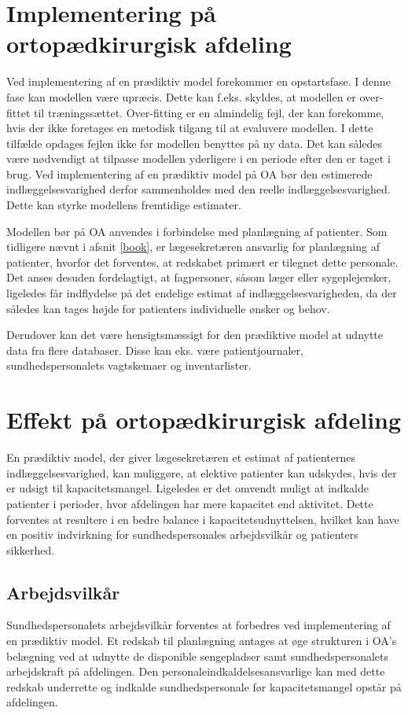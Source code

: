 \section{Implementering på ortopædkirurgisk afdeling}
Ved implementering af en prædiktiv model forekommer en opstartsfase. I denne fase kan modellen være upræcis. Dette kan f.eks. skyldes, at modellen er over-fittet til træningssættet. Over-fitting er en almindelig fejl, der kan forekomme, hvis der ikke foretages en metodisk tilgang til at evaluvere modellen. I dette tilfælde opdages fejlen ikke før modellen benyttes på ny data.  
Det kan således være nødvendigt at tilpasse modellen yderligere i en periode efter den er taget i brug.\cite{Kuhn2013} Ved implementering af en prædiktiv model på OA bør den estimerede indlæggelsesvarighed derfor sammenholdes med den reelle indlæggelsesvarighed. Dette kan styrke modellens fremtidige estimater.

Modellen bør på OA anvendes i forbindelse med planlægning af patienter. Som tidligere nævnt i afsnit \ref{book}, er lægesekretæren ansvarlig for planlægning af patienter, hvorfor det forventes, at redskabet primært er tilegnet dette personale. Det anses desuden fordelagtigt, at fagpersoner, såsom læger eller sygeplejersker, ligeledes får indflydelse på det endelige estimat af indlæggelsesvarigheden, da der således kan tages højde for patienters individuelle ønsker og behov.

Derudover kan det være hensigtsmæssigt for den prædiktive model at udnytte data fra flere databaser. Disse kan eks. være patientjournaler, sundhedspersonalets vagtskemaer og inventarlister.

\section{Effekt på ortopædkirurgisk afdeling}
En prædiktiv model, der giver lægesekretæren et estimat af patienternes indlæggelsesvarighed, kan muliggøre, at elektive patienter kan udskydes, hvis der er udsigt til kapacitetsmangel. Ligeledes er det omvendt muligt at indkalde patienter i perioder, hvor afdelingen har mere kapacitet end aktivitet. Dette forventes at resultere i en bedre balance i kapacitetsudnyttelsen, hvilket kan have en positiv indvirkning for sundhedspersonales arbejdsvilkår og patienters sikkerhed. 


\subsection{Arbejdsvilkår} \label{sundper}
Sundhedspersonalets arbejdsvilkår forventes at forbedres ved implementering af en prædiktiv model. Et redskab til planlægning antages at øge strukturen i OA's belægning ved at udnytte de disponible sengepladser samt sundhedspersonalets arbejdskraft på afdelingen. Den personaleindkaldelsesansvarlige kan med dette redskab underrette og indkalde sundhedspersonale før kapacitetsmangel opstår på afdelingen.

